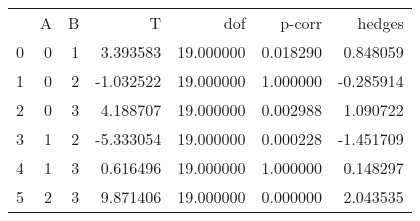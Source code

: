 \begin{tabular}{lrrrrrr}
 & A & B & T & dof & p-corr & hedges \\
0 & 0 & 1 & 3.393583 & 19.000000 & 0.018290 & 0.848059 \\
1 & 0 & 2 & -1.032522 & 19.000000 & 1.000000 & -0.285914 \\
2 & 0 & 3 & 4.188707 & 19.000000 & 0.002988 & 1.090722 \\
3 & 1 & 2 & -5.333054 & 19.000000 & 0.000228 & -1.451709 \\
4 & 1 & 3 & 0.616496 & 19.000000 & 1.000000 & 0.148297 \\
5 & 2 & 3 & 9.871406 & 19.000000 & 0.000000 & 2.043535 \\
\end{tabular}
